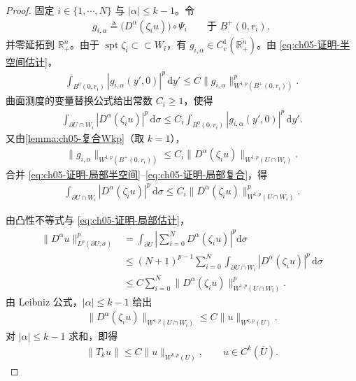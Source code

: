 \begin{proof}
固定 $i\in\{1,\cdots,N\}$ 与 $|\alpha|\leqslant k-1$。令
\begin{align*}
g_{i,\alpha}\triangleq\bigl(D^{\alpha}(\zeta_{i}u)\bigr)\circ\Psi_{i}
\qquad\text{于 }B^{+}(0,r_{i}),
\end{align*}
并零延拓到 $\mathbb{R}^{n}_{+}$。由于 $\operatorname{spt}\zeta_{i}\subset\subset W_{i}$，有 $g_{i,\alpha}\in C^{1}_{c}(\overline{\mathbb{R}^{n}_{+}})$。由 \eqref{eq:ch05-证明-半空间估计}，
\begin{align}
\int_{B^{0}(0,r_{i})}|g_{i,\alpha}(y',0)|^{p}\,\mathrm{d}y'
\leqslant
C\|g_{i,\alpha}\|_{W^{1,p}(B^{+}(0,r_{i}))}^{p}.
\label{eq:ch05-证明-局部半空间}
\end{align}
曲面测度的变量替换公式给出常数 $C_{i}\geqslant1$，使得
\begin{align}
\int_{\partial U\cap W_{i}}|D^{\alpha}(\zeta_{i}u)|^{p}\,\mathrm{d}\sigma
\leqslant
C_{i}\int_{B^{0}(0,r_{i})}|g_{i,\alpha}(y',0)|^{p}\,\mathrm{d}y'.
\label{eq:ch05-证明-局部边界}
\end{align}
又由\cref{lemma:ch05-复合Wkp}（取 $k=1$），
\begin{align}
\|g_{i,\alpha}\|_{W^{1,p}(B^{+}(0,r_{i}))}
\leqslant
C_{i}\|D^{\alpha}(\zeta_{i}u)\|_{W^{1,p}(U\cap W_{i})}.
\label{eq:ch05-证明-局部复合}
\end{align}
合并 \eqref{eq:ch05-证明-局部半空间}--\eqref{eq:ch05-证明-局部复合}，得
\begin{align}
\int_{\partial U\cap W_{i}}|D^{\alpha}(\zeta_{i}u)|^{p}\,\mathrm{d}\sigma
\leqslant
C_{i}\|D^{\alpha}(\zeta_{i}u)\|_{W^{1,p}(U\cap W_{i})}^{p}.
\label{eq:ch05-证明-局部估计}
\end{align}

由凸性不等式与 \eqref{eq:ch05-证明-局部估计}，
\begin{align*}
\|D^{\alpha}u\|_{L^{p}(\partial U;\sigma)}^{p}
&=\int_{\partial U}\left|\sum_{i=0}^{N}D^{\alpha}(\zeta_{i}u)\right|^{p}\mathrm{d}\sigma\\
&\leqslant (N+1)^{p-1}\sum_{i=0}^{N}\int_{\partial U\cap W_{i}}|D^{\alpha}(\zeta_{i}u)|^{p}\,\mathrm{d}\sigma\\
&\leqslant C\sum_{i=0}^{N}\|D^{\alpha}(\zeta_{i}u)\|_{W^{1,p}(U\cap W_{i})}^{p}.
\end{align*}
由 Leibniz 公式，$|\alpha|\leqslant k-1$ 给出
\begin{align*}
\|D^{\alpha}(\zeta_{i}u)\|_{W^{1,p}(U\cap W_{i})}
\leqslant C\|u\|_{W^{k,p}(U)}.
\end{align*}
对 $|\alpha|\leqslant k-1$ 求和，即得
\begin{align}
\|T_{k}u\|
\leqslant
C\|u\|_{W^{k,p}(U)},
\qquad u\in C^{k}(\overline{U}).
\label{eq:ch05-证明-Ck估计}
\end{align}


\end{proof}
